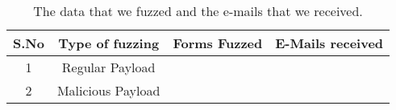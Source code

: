 \begin{table}[!htbp]
	\centering
	\begin{tabular}{|c|c|c|c|}
		\hline
		\multicolumn{1}{|c|}{\textbf{S.No}} &
		\multicolumn{1}{c|}{\textbf{Type of fuzzing}} &
		\multicolumn{1}{c|}{\textbf{Forms Fuzzed}} &
		\multicolumn{1}{c|}{\textbf{E-Mails received}}\\
		\hline
		1 & Regular Payload & \fuzzed & \recd \\
		\hline
		2 & Malicious Payload & \malfuzzed & \success \\
		\hline
	\end{tabular}
	\caption[Fuzzed data]{The data that we fuzzed and the e-mails that we received.}
	\label{tab:fuzzed_data}
\end{table}